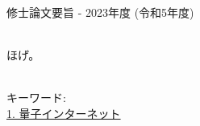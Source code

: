 修士論文要旨 - 2023年度 (令和5年度)
\begin{center}
\begin{large}
\end{large}
\end{center}

~ \\

ほげ。

~ \\
キーワード:\\
\underline{1. 量子インターネット}
\begin{flushright}
\dept \\
\author
\end{flushright}
